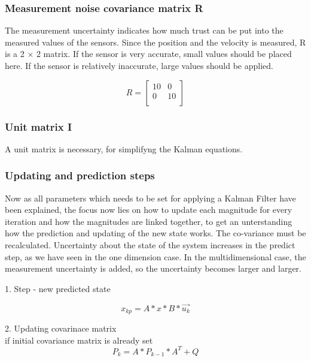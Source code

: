 \subsubsection{Measurement noise covariance matrix R}
The measurement uncertainty indicates how much trust can be put into the measured values of the
sensors. Since the position and the velocity is measured, R is a 2 × 2 matrix. If the
sensor is very accurate, small values should be placed here. If the sensor is relatively
inaccurate, large values should be applied.

\begin{equation}
R = \begin{bmatrix} 
10 & 0  \\
0 & 10 \\
\end{bmatrix}
\end{equation}

\subsubsection{Unit matrix I}
A unit matrix is necessary, for simplifyng the Kalman equations.

\subsubsection{Updating and prediction steps}
Now as all parameters which needs to be set for applying a Kalman Filter have been explained, the focus now lies on how to update each magnitude for every iteration and how the magnitudes are linked together, to get an unterstanding how the prediction and updating of the new state works. 
The co-variance must be recalculated. Uncertainty about the state of the system increases in the predict step, as we have seen in the one dimension case. In the multidimensional case, the measurement uncertainty is added, so the uncertainty becomes larger and larger.

1. Step - new predicted state

\begin{equation}
x_{kp} = A * x * B * \vec{u_{k}}
\end{equation}


2. Updating covarinace matrix\\ 
if initial covariance matrix is already set\\
\begin{equation}
P_{k} =A * P_{k-1} * A^{T} + Q
\end{equation}

